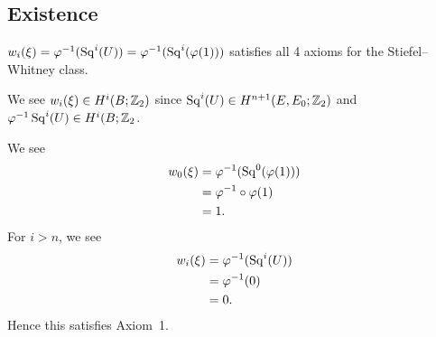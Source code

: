\subsection{Existence}

\begin{claim}
$w_{i}(\xi)=\varphi^{-1}(\operatorname{Sq}^{i}(U))=\varphi^{-1}(\operatorname{Sq}^{i}(\varphi(1)))$
  satisfies all 4 axioms for the Stiefel--Whitney class.
\end{claim}

\begin{Proof}
We see $w_{i}(\xi)\in H^{i}(B;\mathbb{Z}_{2})$ since $\operatorname{Sq}^{i}(U)\in H^{n+1}(E,E_{0};\mathbb{Z}_{2})$
and $\varphi^{-1}\operatorname{Sq}^{i}(U)\in H^{i}(B;\mathbb{Z}_{2}$.

We see
\begin{subequations}
  \begin{align}
w_{0}(\xi) &= \varphi^{-1}(\operatorname{Sq}^{0}(\varphi(1)))\\
&= \varphi^{-1}\circ\varphi(1)\\
&= 1.
  \end{align}
\end{subequations}
For $i>n$, we see
\begin{subequations}
  \begin{align}
w_{i}(\xi) &= \varphi^{-1}(\operatorname{Sq}^{i}(U))\\
&= \varphi^{-1}(0)\\
&= 0.
  \end{align}
\end{subequations}
Hence this satisfies Axiom~1.
\end{Proof}

